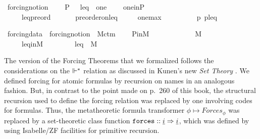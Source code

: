 \begin{isabelle}
\isamarkupfalse%
\ forcing{\isacharunderscore}{\kern0pt}notion\ {\isacharequal}{\kern0pt}\isanewline
\ \ \ P\ {\isacharparenleft}{\kern0pt}{\isacartoucheopen}{\isasymbbbP}{\isacartoucheclose}{\isacharparenright}{\kern0pt}\ \ leq\ \ one\ {\isacharparenleft}{\kern0pt}{\isacartoucheopen}{\isasymone}{\isacartoucheclose}{\isacharparenright}{\kern0pt}\isanewline
\ \ \ one{\isacharunderscore}{\kern0pt}in{\isacharunderscore}{\kern0pt}P{\isacharcolon}{\kern0pt}\ \ \ \ \ \ \ {\isachardoublequoteopen}{\isasymone}\ {\isasymin}\ {\isasymbbbP}{\isachardoublequoteclose}\isanewline
\ \ \ \ \ leq{\isacharunderscore}{\kern0pt}preord{\isacharcolon}{\kern0pt}\ \ \ \ \ \ \ {\isachardoublequoteopen}preorder{\isacharunderscore}{\kern0pt}on{\isacharparenleft}{\kern0pt}{\isasymbbbP}{\isacharcomma}{\kern0pt}leq{\isacharparenright}{\kern0pt}{\isachardoublequoteclose}\isanewline
\ \ \ \ \ one{\isacharunderscore}{\kern0pt}max{\isacharcolon}{\kern0pt}\ \ \ \ \ \ \ \ \ \ {\isachardoublequoteopen}{\isasymforall}p{\isasymin}{\isasymbbbP}{\isachardot}{\kern0pt}\ {\isasymlangle}p{\isacharcomma}{\kern0pt}{\isasymone}{\isasymrangle}{\isasymin}leq{\isachardoublequoteclose}
\end{isabelle}

\begin{isabelle}
\isamarkupfalse%
\ forcing{\isacharunderscore}{\kern0pt}data{}\ {\isacharequal}{\kern0pt}\ forcing{\isacharunderscore}{\kern0pt}notion\ {\isacharplus}{\kern0pt}\ M{\isacharunderscore}{\kern0pt}ctm{}\ {\isacharplus}{\kern0pt}\isanewline
\ \ \ P{\isacharunderscore}{\kern0pt}in{\isacharunderscore}{\kern0pt}M{\isacharcolon}{\kern0pt}\ \ \ \ \ \ \ \ \ \ \ {\isachardoublequoteopen}{\isasymbbbP}\ {\isasymin}\ M{\isachardoublequoteclose}\isanewline
\ \ \ \ \ leq{\isacharunderscore}{\kern0pt}in{\isacharunderscore}{\kern0pt}M{\isacharcolon}{\kern0pt}\ \ \ \ \ \ \ \ \ {\isachardoublequoteopen}leq\ {\isasymin}\ M{\isachardoublequoteclose}
\end{isabelle}
The version of the Forcing Theorems that we formalized follows the
considerations on the $\Vdash^*$ relation as discussed in Kunen's new
\emph{Set Theory}
\cite[p.~257ff]{kunen2011set}.
We defined forcing for atomic formulas by recursion on names in an
analogous fashion. But, in contrast to the point made on
p.~260 of this book, the structural recursion used to define the forcing
relation was replaced by one  involving codes for formulas. Thus, the metatheoretic formula
transformer $\phi\mapsto\mathit{Forces}_\phi$ was replaced by a
set-theoretic class function $\forceisa:: \tyi \fun \tyi$, which was defined by using
Isabelle/ZF facilities for primitive recursion.

